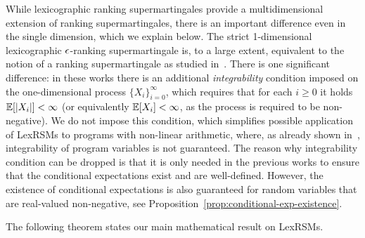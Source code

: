 While lexicographic ranking supermartingales provide a multidimensional extension of ranking supermartingales, 
there is an important difference even in the single dimension, which we explain below.
The strict 1-dimensional lexicographic $\epsilon$-ranking supermartingale is, to a large extent, equivalent to the notion of a ranking supermartingale as studied in~\cite{HolgerPOPL,CFNH16:prob-termination}. There is one significant difference: in these works there is an additional \emph{integrability} condition imposed on the one-dimensional process $\{X_i\}_{i=0}^{\infty}$, which requires that for each $i\geq 0$ it holds $\mathbb{E}[|X_i|]<\infty$ (or equivalently $\mathbb{E}[X_i]<\infty$, as the process is required to be non-negative). We do not impose this condition, which simplifies possible application of LexRSMs to programs with non-linear arithmetic, where, as already shown in~\cite{HolgerPOPL}, integrability of program variables is not guaranteed.
The reason why integrability condition can be dropped is that it is only needed in the previous works to ensure that the conditional expectations exist and are well-defined. However, the existence of conditional expectations is also guaranteed for random variables that are real-valued non-negative, see Proposition~\ref{prop:conditional-exp-existence}. 

The following theorem states our main mathematical result on LexRSMs.

